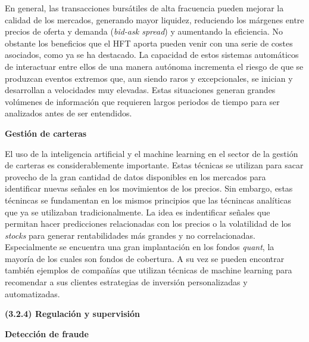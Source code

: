 \documentclass[]{article}
\begin{document}
\setlength\parskip{5ex}

En general, las transacciones bursátiles de alta fracuencia pueden
mejorar la calidad de los mercados, generando mayor liquidez, reduciendo
los márgenes entre precios de oferta y demanda (\emph{bid-ask spread}) y
aumentando la eficiencia. No obstante los beneficios que el HFT aporta
pueden venir con una serie de costes asociados, como ya se ha destacado.
La capacidad de estos sistemas automáticos de interactuar entre ellos de
una manera autónoma incrementa el riesgo de que se produzcan eventos
extremos que, aun siendo raros y excepcionales, se inician y desarrollan
a velocidades muy elevadas. Estas situaciones generan grandes volúmenes
de información que requieren largos periodos de tiempo para ser
analizados antes de ser entendidos.

\setlength\parskip{5ex}

\textbf{Gestión de carteras}

El uso de la inteligencia artificial y el machine learning en el sector
de la gestión de carteras es considerablemente importante. Estas
técnicas se utilizan para sacar provecho de la gran cantidad de datos
disponibles en los mercados para identificar nuevas señales en los
movimientos de los precios. Sin embargo, estas técnincas se fundamentan
en los mismos principios que las técnincas analíticas que ya se
utilizaban tradicionalmente. La idea es indentificar señales que
permitan hacer predicciones relacionadas con los precios o la
volatilidad de los \emph{stocks} para generar rentabilidades más grandes
y no correlacionadas. Especialmente se encuentra una gran implantación
en los fondos \emph{quant}, la mayoría de los cuales son fondos de
cobertura. A su vez se pueden encontrar también ejemplos de compañías
que utilizan técnicas de machine learning para recomendar a sus clientes
estrategias de inversión personalizadas y automatizadas.

\textbf{(3.2.4) Regulación y supervisión}

\textbf{Detección de fraude}
\end{document}
